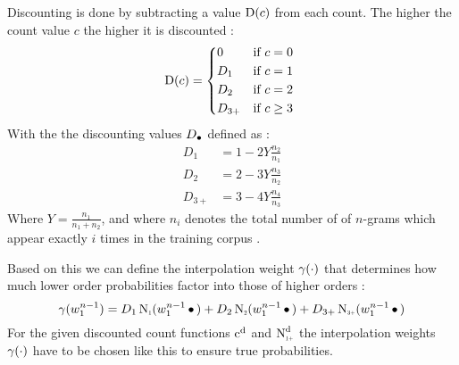 Discounting is done by subtracting a value $\operatorname{D}(c)$ from each count.
The higher the count value $c$ the higher it is discounted
\parencite{ChenGoodman1999}:
\begin{equation}
  \Discount(c) =
    \begin{dcases*}
      0      & if $c = 0$ \\
      D_1    & if $c = 1$ \\
      D_2    & if $c = 2$ \\
      D_{3+} & if $c \geq 3$
    \end{dcases*}
\end{equation}
With the the discounting values $D_\bullet$ defined as
\parencite{ChenGoodman1999}:
\begin{subequations}
  \label{eq:discounts}
  \begin{align}
    D_1    &= 1 - 2 Y \frac{n_2}{n_1} \\
    D_2    &= 2 - 3 Y \frac{n_3}{n_2} \\
    D_{3+} &= 3 - 4 Y \frac{n_4}{n_3}
  \end{align}
\end{subequations}
Where $Y = \frac{n_1}{n_1 + n_2}$, and where $n_i$
denotes the total number of of \mbox{$n$-grams} which appear exactly $i$ times
in the training corpus \parencite{ChenGoodman1999}.

Based on this we can define the interpolation weight $\gamma(\cdot)$ that
determines how much lower order probabilities factor into those of higher
orders \parencite{ChenGoodman1999}:
\begin{equation}
  \label{eq:review-gamma}
  \gamma(w_1^{n-1}) =   D_1    \ContCountI    (w_1^{n-1} \WSkp)
                      + D_2    \ContCountII   (w_1^{n-1} \WSkp)
                      + D_{3+} \ContCountIIIp (w_1^{n-1} \WSkp)
\end{equation}
For the given discounted count functions $\DiscountedCount$ and
$\DiscountedCount*$ the interpolation weights $\gamma(\cdot)$ have to be
chosen like this to ensure true probabilities.

